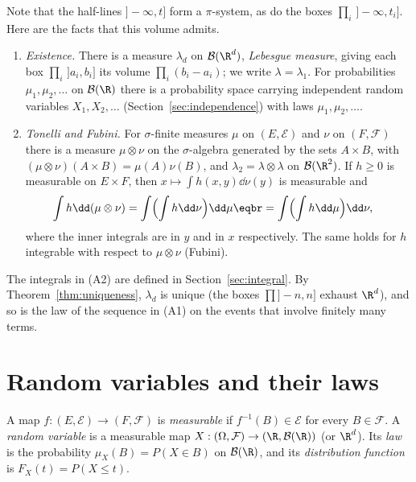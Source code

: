 Note that the half-lines $]-\infty,t]$ form a $\pi$-system, as do the boxes $\prod_i\,]-\infty,t_i]$. Here are the facts that
this volume admits.

\begin{reminder}
\begin{enumerate}[label=(A\arabic*)]
\item \emph{Existence.} There is a measure $\lambda_d$ on $\mathcal B(\R^d)$, \emph{Lebesgue measure}, giving each box $\prod_i\,]a_i,b_i]$ its volume $\prod_i(b_i-a_i)$;
we write $\lambda=\lambda_1$. For probabilities $\mu_1,\mu_2,\ldots$ on $\mathcal B(\R)$ there is a probability space carrying independent
random variables $X_1,X_2,\ldots$ (Section~\ref{sec:independence}) with laws $\mu_1,\mu_2,\ldots$.
\item \emph{Tonelli and Fubini.} For $\sigma$-finite measures $\mu$ on $(E,\mathcal E)$ and $\nu$ on $(F,\mathcal F)$ there is a measure $\mu\otimes\nu$ on the
$\sigma$-algebra generated by the sets $A\times B$, with $(\mu\otimes\nu)(A\times B)=\mu(A)\nu(B)$, and $\lambda_2=\lambda\otimes\lambda$ on $\mathcal B(\R^2)$. If
$h\ge0$ is measurable on $E\times F$, then $x\mapsto\int h(x,y)\dd\nu(y)$ is measurable and
\[
\begin{aligned}\int h\dd(\mu\otimes\nu)&=\int\Bigl(\int h\dd\nu\Bigr)\dd\mu\eqbr=\int\Bigl(\int h\dd\mu\Bigr)\dd\nu,\end{aligned}
\]
where the inner integrals are in $y$ and in $x$ respectively.
The same holds for $h$ integrable with respect to $\mu\otimes\nu$ (Fubini).
\end{enumerate}
\end{reminder}

The integrals in (A2) are defined in Section~\ref{sec:integral}. By Theorem~\ref{thm:uniqueness}, $\lambda_d$ is unique (the boxes $\prod]-n,n]$
exhaust $\R^d$), and so is the law of the sequence in (A1) on the events that involve finitely many terms.

\section{Random variables and their laws}

\begin{definition}
A map $f:(E,\mathcal E)\to(F,\mathcal F)$ is \emph{measurable} if $f^{-1}(B)\in\mathcal E$ for every $B\in\mathcal F$. A \emph{random variable} is a measurable map
$X:(\Omega,\mathcal F)\to(\R,\mathcal B(\R))$ (or $\R^d$). Its \emph{law} is the probability $\mu_X(B)=P(X\in B)$ on $\mathcal B(\R)$, and its
\emph{distribution function} is $F_X(t)=P(X\le t)$.
\end{definition}

